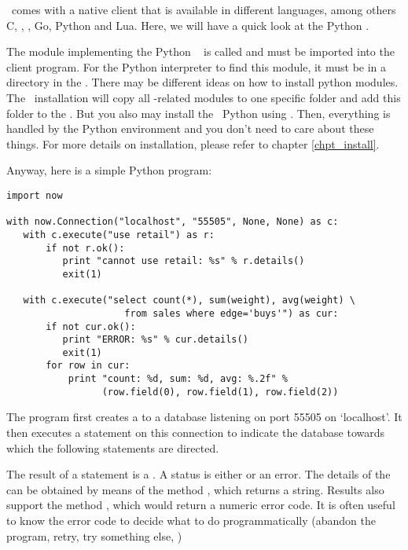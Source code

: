 \nowdb\ comes with a native client 
that is available in different languages, among others
C, \CC, \csharp, Go, Python and Lua.
Here, we will have a quick look at the Python .

The module implementing the Python \nowdb\ 
is called  and must be imported into the client program.
For the Python interpreter to find this module,
it must be in a directory in the .
There may be different ideas on how to install python modules.
The \nowdb\ installation will copy all \nowdb-related modules
to one specific folder and add this folder to the
. But you also may install
the \nowdb\ Python  using .
Then, everything is handled by the Python environment
and you don't need to care about these things.
For more details on installation, please refer
to chapter \ref{chpt_install}.

Anyway, here is a simple Python program:

\begin{python}
\begin{lstlisting}
import now

with now.Connection("localhost", "55505", None, None) as c:
   with c.execute("use retail") as r:
       if not r.ok():
          print "cannot use retail: %s" % r.details()
          exit(1)

   with c.execute("select count(*), sum(weight), avg(weight) \
                     from sales where edge='buys'") as cur:
       if not cur.ok():
          print "ERROR: %s" % cur.details()
          exit(1)
       for row in cur:
           print "count: %d, sum: %d, avg: %.2f" %
                 (row.field(0), row.field(1), row.field(2))
\end{lstlisting}
\end{python}

The program first creates a 
to a database listening on port 55505 on `localhost'.
It then executes a  statement on this connection
to indicate the database towards which
the following statements are directed.

The result of a  statement is a .
A status is either  or an error.
The details of the can be obtained by means of the method
, which returns a string.
Results also support the method ,
which would return a numeric error code.
It is often useful to know the error code to decide
what to do programmatically (abandon the program,
retry, try something else, \etc)

